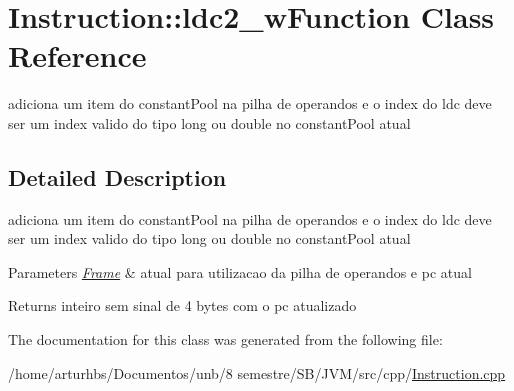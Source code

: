 \hypertarget{classInstruction_1_1ldc2__wFunction}{}\section{Instruction\+:\+:ldc2\+\_\+w\+Function Class Reference}
\label{classInstruction_1_1ldc2__wFunction}


adiciona um item do constant\+Pool na pilha de operandos e o index do ldc deve ser um index valido do tipo long ou double no constant\+Pool atual  




\subsection{Detailed Description}
adiciona um item do constant\+Pool na pilha de operandos e o index do ldc deve ser um index valido do tipo long ou double no constant\+Pool atual 


\begin{DoxyParams}{Parameters}
{\em \hyperlink{classFrame}{Frame}} & atual para utilizacao da pilha de operandos e pc atual \\
\hline
\end{DoxyParams}
\begin{DoxyReturn}{Returns}
inteiro sem sinal de 4 bytes com o pc atualizado 
\end{DoxyReturn}


The documentation for this class was generated from the following file\+:\begin{DoxyCompactItemize}
\item 
/home/arturhbs/\+Documentos/unb/8 semestre/\+S\+B/\+J\+V\+M/src/cpp/\hyperlink{Instruction_8cpp}{Instruction.\+cpp}\end{DoxyCompactItemize}
